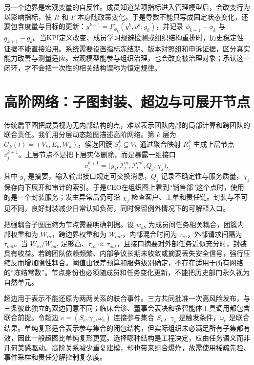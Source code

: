 另一个边界是宏观变量的自反性。成员知道某项指标进入管理模型后，会改变行为以影响指标，使 $R$ 和 $F$ 本身随政策变化。于是导数不能只写成固定状态变化，还要包含度量与目标的更新：$y^{k+1}=F_{\phi_k}(y^k,v^k;g_k)$，并记录 $\phi_{k+1}-\phi_k$ 与 $g_{k+1}-g_k$。当KPI定义改变、成员学习规避检测或组织结构重排时，历史稳定性证据不能直接沿用。系统需要设置指标冻结期、版本对照组和申诉证据，区分真实能力改善与测量适应。宏观模型能参与组织治理，也会改变被治理对象；承认这一闭环，才不会把一次性的相关结构误称为恒定规律。

\section{高阶网络：子图封装、超边与可展开节点}
\label{sec:emergence_of_higher_order_networks}

传统扁平图把成员视为无内部结构的点，难以表示团队内部的局部计算和跨团队的联合责任。我们用分层动态超图描述高阶网络。第 $k$ 层为 $G_k(t)=(V_k,E_k,W_k)$，候选团簇 $S_j^k\subseteq V_k$ 通过聚合映射 $R_j^k$ 生成上层节点 $v_j^{k+1}$。上层节点不是把下层实体删除，而是暴露一组接口
\begin{equation}
v_j^{k+1}=\bigl(y_j,\mathcal I_j^{in},\mathcal I_j^{out},Q_j,\chi_j\bigr),
\end{equation}
其中 $y_j$ 是摘要，输入输出接口规定可交换消息，$Q_j$ 记录不确定性与服务质量，$\chi_j$ 保存向下展开和审计的索引。于是CEO在组织图上看到“销售部”这个点时，使用的是一个封装服务；发生异常后仍可沿 $\chi_j$ 检查客户、工单和责任链。封装与不可见不同，良好封装减少日常认知负荷，同时保留例外情况下的可解释入口。

把强耦合子图压缩为节点需要明确判据。设 $w_{ab}$ 为成员间任务相关耦合，团簇内部权重和为 $W_{in}$，跨边界权重和为 $W_{out}$，内部混合时间为 $\tau_{in}$，外部请求间隔为 $\tau_{out}$。当 $W_{in}/W_{out}$ 足够高、$\tau_{in}\ll\tau_{out}$，且接口摘要对外部任务近似充分时，封装具有收益。若跨团队依赖频繁、内部争议长期未收敛或摘要丢失安全信号，强行压缩反而增加隐性耦合。阈值由误差预算和服务级别确定，不存在适用于所有网络的“冻结常数”。节点身份也必须随成员和任务变化更新，不能把历史部门永久视为自然单元。

超边用于表示不能还原为两两关系的联合事件。三方共同批准一次高风险发布，与三条彼此独立的双边同意不同；临床会诊、董事会表决和多智能体工具调用都包含联合前提。令超边 $e=(S_e,\gamma_e,\omega_e)$ 连接参与集合 $S_e$，$\gamma_e$ 是触发条件，$\omega_e$ 是联合结果。单纯复形适合表示参与集合的闭包结构，但实际组织未必满足所有子集都有效，因此一般超图比单纯复形更宽。选择哪种结构是工程决定，应由任务语义而非几何美感驱动。高阶关系减少重复建模，却也带来组合爆炸，故需使用稀疏先验、事件采样和责任分解控制复杂度。

